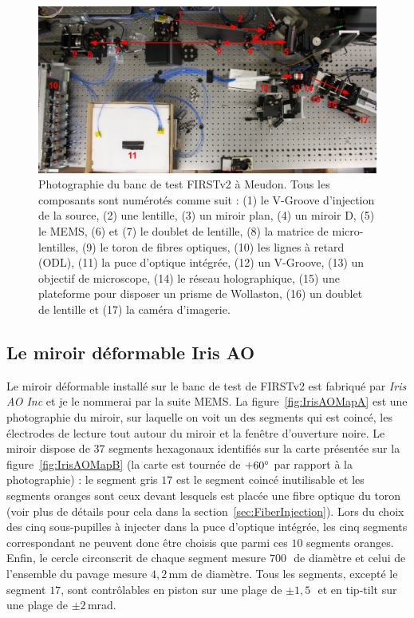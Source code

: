 \begin{figure}[ht!]
    \centering
    \includegraphics[width=\figwidth]{Figure_Chap2/20211215_FIRSTv2_MeudonBench_03.png}
    \caption[Photographie du banc de test FIRSTv2 à Meudon.]{Photographie du banc de test FIRSTv2 à Meudon. Tous les composants sont numérotés comme suit : (1) le V-Groove d'injection de la source, (2) une lentille, (3) un miroir plan, (4) un miroir D, (5) le MEMS, (6) et (7) le doublet de lentille, (8) la matrice de micro-lentilles, (9) le toron de fibres optiques, (10) les lignes à retard (ODL), (11) la puce d'optique intégrée, (12) un V-Groove, (13) un objectif de microscope, (14) le réseau holographique, (15) une plateforme pour disposer un prisme de Wollaston, (16) un doublet de lentille et (17) la caméra d'imagerie.}
    \label{fig:FIRSTv2BenchPhoto}
\end{figure}


\subsection{Le miroir déformable Iris AO}

Le miroir déformable installé sur le banc de test de \ac{FIRSTv2} est fabriqué par \textit{Iris AO Inc} et je le nommerai par la suite \ac{MEMS}. La figure~\ref{fig:IrisAOMapA} est une photographie du miroir, sur laquelle on voit un des segments qui est coincé, les électrodes de lecture tout autour du miroir et la fenêtre d'ouverture noire. Le miroir dispose de $37$ segments hexagonaux identifiés sur la carte présentée sur la figure~\ref{fig:IrisAOMapB} (la carte est tournée de $+60^{\circ}$ par rapport à la photographie) : le segment gris $17$ est le segment coincé inutilisable et les segments oranges sont ceux devant lesquels est placée une fibre optique du toron (voir plus de détails pour cela dans la section~\ref{sec:FiberInjection}). Lors du choix des cinq sous-pupilles à injecter dans la puce d'optique intégrée, les cinq segments correspondant ne peuvent donc être choisis que parmi ces $10$ segments oranges. Enfin, le cercle circonscrit de chaque segment mesure $700 \,$\um~de diamètre et celui de l'ensemble du pavage mesure $4,2 \,$mm de diamètre. Tous les segments, excepté le segment $17$, sont contrôlables en piston sur une plage de $\pm 1,5 \,$\um~et en tip-tilt sur une plage de $\pm 2\,$mrad.

